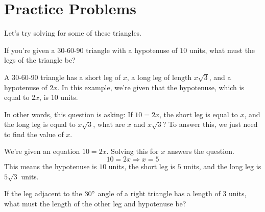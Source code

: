 \section*{Practice Problems}
Let's try solving for some of these triangles.
\begin{problem}
    If you're given a 30-60-90 triangle with a hypotenuse of $10$ units, what must the legs of the triangle be?
\end{problem}
\begin{solution}
    A 30-60-90 triangle has a short leg of $x$, a long leg of length $x\sqrt{3}$, and a hypotenuse of $2x$. In this example, we're given that the hypotenuse, which is equal to $2x$, is $10$ units.

    In other words, this question is asking: If $10 = 2x$, the short leg is equal to $x$, and the long leg is equal to $x\sqrt{3}$, what are $x$ and $x\sqrt{3}$? To answer this, we just need to find the value of $x$.

    We're given an equation $10 = 2x$. Solving this for $x$ answers the question.
    \[
        10 = 2x \Longrightarrow x = 5
    \]
    This means the hypotenuse is $10$ units, the short leg is $5$ units, and the long leg is $5\sqrt{3}$ units.
\end{solution}
\begin{problem}
    If the leg adjacent to the $30\degree$ angle of a right triangle has a length of $3$ units, what must the length of the other leg and hypotenuse be?
\end{problem}
